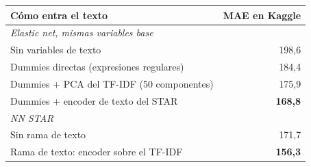 \begin{tabular}{l r}
\toprule
Cómo entra el texto & MAE en Kaggle \\
\midrule
\multicolumn{2}{l}{\textit{Elastic net, mismas variables base}} \\
Sin variables de texto & 198,6 \\
Dummies directas (expresiones regulares) & 184,4 \\
Dummies + PCA del TF-IDF (50 componentes) & 175,9 \\
Dummies + encoder de texto del STAR & \textbf{168,8} \\
\midrule
\multicolumn{2}{l}{\textit{NN STAR}} \\
Sin rama de texto & 171,7 \\
Rama de texto: encoder sobre el TF-IDF & \textbf{156,3} \\
\bottomrule
\end{tabular}
